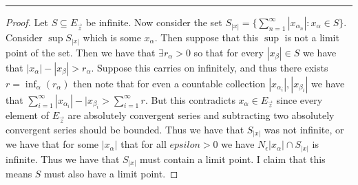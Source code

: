 \documentclass[leqno]{article}
\theoremstyle{nonumberplain}
\newtheorem{proof}{Proof}
\begin{document}
\noindent\rule[0.5ex]{\linewidth}{1pt}

\begin{proof}
Let $S\subseteq E_{\vec{z}}$ be infinite. Now consider the set $S_{|x|} = \{\sum_{n=1}^\infty |x_{\alpha_n}| \colon x_{\alpha}\in S\}$.  Consider $\sup S_{|x|}$ which is some $x_\alpha$. Then suppose that this $\sup$ is not a limit point of the set. Then we have that $\exists r_\alpha >0$ so that for every $|x_\beta| \in S$ we have that $|x_\alpha|-|x_\beta|>r_\alpha$.  Suppose this carries on infinitely, and thus there exists $r=\inf_{\alpha}(r_\alpha)$ then note that for even a countable collection $|x_{\alpha_i}|,|x_{\beta_i}|$ we have that $\sum_{i=1}^{\infty} |x_{\alpha_i}|-|x_{\beta_i}>\sum_{i=1}^{\infty}r$. But this contradicts $x_\alpha \in E_{\vec{z}}$ since every element of $E_{\vec{z}}$ are absolutely convergent series and subtracting two absolutely convergent series should be bounded. Thus we have that $S_{|x|}$ was not infinite, or we have that for some $|x_\alpha|$ that for all $epsilon>0$ we have $N_{\epsilon}|x_\alpha|\cap S_{|x|}$ is infinite.  Thus we have that $S_{|x|}$ must contain a limit point.  I claim that this means $S$ must also have a limit point.
\end{proof}

\pagebreak
\end{document}
